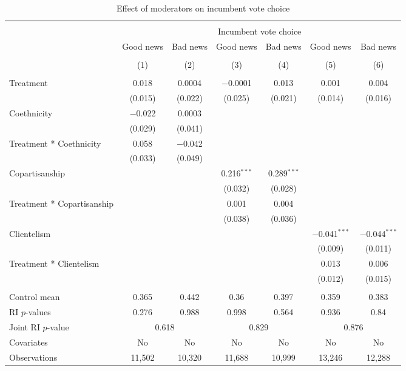 
\begin{table}[!htbp] \centering 
  \caption{Effect of moderators on incumbent vote choice} 
  \label{moderators} 
\begin{tabular}{@{\extracolsep{1pt}}lcccccc} 
\\[-1.8ex]\hline 
\hline \\[-1.8ex] 
 & \multicolumn{6}{c}{Incumbent vote choice} \\ 
\cline{2-7} 
 & Good news & Bad news & Good news & Bad news & Good news & Bad news \\ 
\cline{2-7}
\\[-1.8ex] & (1) & (2) & (3) & (4) & (5) & (6)\\ 
\hline \\[-1.8ex] 
 Treatment & 0.018 & 0.0004 & $-$0.0001 & 0.013 & 0.001 & 0.004 \\ 
  & (0.015) & (0.022) & (0.025) & (0.021) & (0.014) & (0.016) \\ 
  Coethnicity & $-$0.022 & 0.0003 &  &  &  &  \\ 
  & (0.029) & (0.041) &  &  &  &  \\ 
  Treatment * Coethnicity & 0.058 & $-$0.042 &  &  &  &  \\ 
  & (0.033) & (0.049) &  &  &  &  \\ 
  Copartisanship &  &  & 0.216$^{***}$ & 0.289$^{***}$ &  &  \\ 
  &  &  & (0.032) & (0.028) &  &  \\ 
  Treatment * Copartisanship &  &  & 0.001 & 0.004 &  &  \\ 
  &  &  & (0.038) & (0.036) &  &  \\ 
  Clientelism &  &  &  &  & $-$0.041$^{***}$ & $-$0.044$^{***}$ \\ 
  &  &  &  &  & (0.009) & (0.011) \\ 
  Treatment * Clientelism &  &  &  &  & 0.013 & 0.006 \\ 
  &  &  &  &  & (0.012) & (0.015) \\ 
 \hline \\[-1.8ex] 
Control mean & 0.365 & 0.442 & 0.36 & 0.397 & 0.359 & 0.383 \\ 
RI $p$-values & 0.276 & 0.988 & 0.998 & 0.564 & 0.936 & 0.84 \\ 
Joint RI $p$-value & \multicolumn{2}{c}{0.618} & \multicolumn{2}{c}{0.829} & \multicolumn{2}{c}{0.876} \\
Covariates & No & No & No & No & No & No \\ 
Observations & 11,502 & 10,320 & 11,688 & 10,999 & 13,246 & 12,288 \\ 

\end{tabular}
\end{table}
